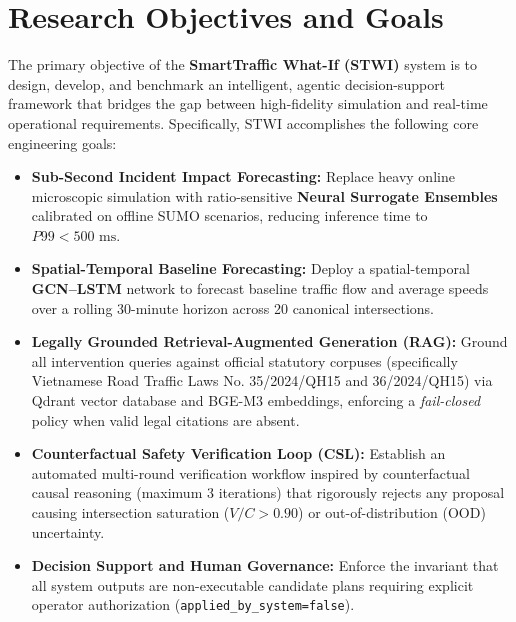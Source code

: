 \section{Research Objectives and Goals}
The primary objective of the \textbf{SmartTraffic What-If (STWI)} system is to design, develop, and benchmark an intelligent, agentic decision-support framework that bridges the gap between high-fidelity simulation and real-time operational requirements. Specifically, STWI accomplishes the following core engineering goals:
\begin{itemize}[leftmargin=1.5cm, label=$\bullet$]
  \item \textbf{Sub-Second Incident Impact Forecasting:} Replace heavy online microscopic simulation with ratio-sensitive \textbf{Neural Surrogate Ensembles} calibrated on offline SUMO scenarios, reducing inference time to $P99 < 500\text{ ms}$.
  \item \textbf{Spatial-Temporal Baseline Forecasting:} Deploy a spatial-temporal \textbf{GCN--LSTM} network to forecast baseline traffic flow and average speeds over a rolling 30-minute horizon across 20 canonical intersections.
  \item \textbf{Legally Grounded Retrieval-Augmented Generation (RAG):} Ground all intervention queries against official statutory corpuses (specifically Vietnamese Road Traffic Laws No. 35/2024/QH15 and 36/2024/QH15) via Qdrant vector database and BGE-M3 embeddings, enforcing a \textit{fail-closed} policy when valid legal citations are absent.
  \item \textbf{Counterfactual Safety Verification Loop (CSL):} Establish an automated multi-round verification workflow inspired by counterfactual causal reasoning (maximum 3 iterations) that rigorously rejects any proposal causing intersection saturation ($V/C > 0.90$) or out-of-distribution (OOD) uncertainty.
  \item \textbf{Decision Support and Human Governance:} Enforce the invariant that all system outputs are non-executable candidate plans requiring explicit operator authorization (\texttt{applied\_by\_system=false}).
\end{itemize}

